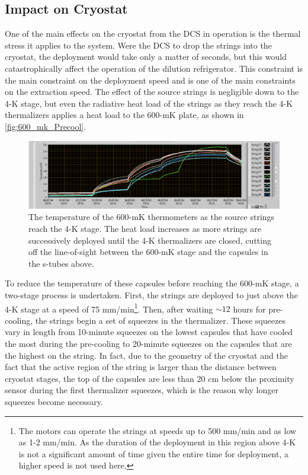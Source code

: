 \subsection*{Impact on Cryostat}
One of the main effects on the cryostat from the DCS in operation is the thermal stress it applies to the system.
Were the DCS to drop the strings into the cryostat, the deployment would take only a matter of seconds, but this would catastrophically affect the operation of the dilution refrigerator.
This constraint is the main constraint on the deployment speed and is one of the main constraints on the extraction speed.
The effect of the source strings is negligible down to the 4-K stage, but even the radiative heat load of the strings as they reach the 4-K thermalizers applies a heat load to the 600-mK plate, as shown in \autoref{fig:600_mk_Precool}.
\begin{figure}
    \centering
    \includegraphics[width=0.8\linewidth]{Figures/600mK_temperature_during_precool.png}
    \caption[The temperature of the 600-mK thermometers as the source strings reach the 4-K stage]
    {The temperature of the 600-mK thermometers as the source strings reach the 4-K stage.
    The heat load increases as more strings are successively deployed until the 4-K thermalizers are closed, cutting off the line-of-sight between the 600-mK stage and the capsules in the s-tubes above.}
    \label{fig:600_mk_Precool}
\end{figure}
To reduce the temperature of these capsules before reaching the 600-mK stage, a two-stage process is undertaken.
First, the strings are deployed to just above the 4-K stage at a speed of 75 mm/min\footnote{The motors can operate the strings at speeds up to 500 mm/min and as low as 1-2 mm/min.
As the duration of the deployment in this region above 4-K is not a significant amount of time given the entire time for deployment, a higher speed is not used here.}.
Then, after waiting $\sim12$ hours for pre-cooling, the strings begin a set of squeezes in the thermalizer.
These squeezes vary in length from 10-minute squeezes on the lowest capsules that have cooled the most during the pre-cooling to 20-minute squeezes on the capsules that are the highest on the string.
In fact, due to the geometry of the cryostat and the fact that the active region of the string is larger than the distance between cryostat stages, the top of the capsules are less than 20 cm below the proximity sensor during the first thermalizer squeezes, which is the reason why longer squeezes become necessary.
